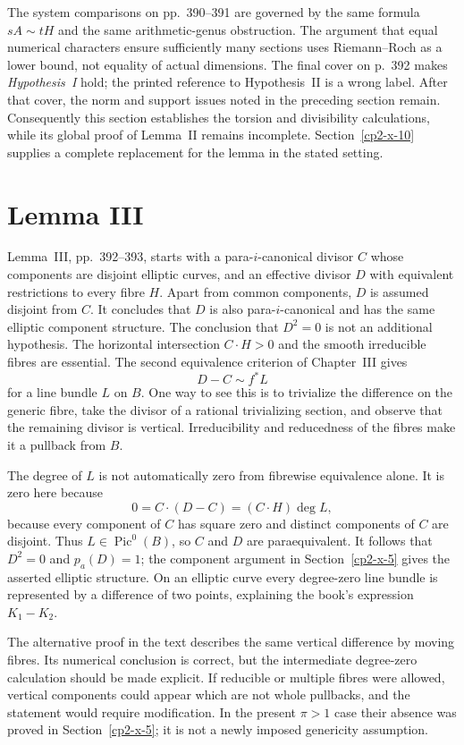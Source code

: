 The system comparisons on pp.~390--391 are governed by the same formula $sA\sim tH$ and the same arithmetic-genus obstruction. The argument that equal numerical characters ensure sufficiently many sections uses Riemann--Roch as a lower bound, not equality of actual dimensions. The final cover on p.~392 makes \emph{Hypothesis~I} hold; the printed reference to Hypothesis~II is a wrong label. After that cover, the norm and support issues noted in the preceding section remain. Consequently this section establishes the torsion and divisibility calculations, while its global proof of Lemma~II remains incomplete. Section~\ref{cp2-x-10} supplies a complete replacement for the lemma in the stated setting.

\section{Lemma III}
\label{cp2-x-9}

Lemma~III, pp.~392--393, starts with a para-$i$-canonical divisor $C$ whose components are disjoint elliptic curves, and an effective divisor $D$ with equivalent restrictions to every fibre $H$. Apart from common components, $D$ is assumed disjoint from $C$. It concludes that $D$ is also para-$i$-canonical and has the same elliptic component structure. The conclusion that $D^2=0$ is not an additional hypothesis. The horizontal intersection $C\cdot H>0$ and the smooth irreducible fibres are essential. The second equivalence criterion of Chapter~III gives
\[
 D-C\sim f^*L
\]
for a line bundle $L$ on $B$. One way to see this is to trivialize the difference on the generic fibre, take the divisor of a rational trivializing section, and observe that the remaining divisor is vertical. Irreducibility and reducedness of the fibres make it a pullback from $B$.

The degree of $L$ is not automatically zero from fibrewise equivalence alone. It is zero here because
\[
 0=C\cdot(D-C)=(C\cdot H)\deg L,
\]
because every component of $C$ has square zero and distinct components of $C$ are disjoint. Thus $L\in\operatorname{Pic}^0(B)$, so $C$ and $D$ are paraequivalent. It follows that $D^2=0$ and $p_a(D)=1$; the component argument in Section~\ref{cp2-x-5} gives the asserted elliptic structure. On an elliptic curve every degree-zero line bundle is represented by a difference of two points, explaining the book's expression $K_1-K_2$.

The alternative proof in the text describes the same vertical difference by moving fibres. Its numerical conclusion is correct, but the intermediate degree-zero calculation should be made explicit. If reducible or multiple fibres were allowed, vertical components could appear which are not whole pullbacks, and the statement would require modification. In the present $\pi>1$ case their absence was proved in Section~\ref{cp2-x-5}; it is not a newly imposed genericity assumption.

